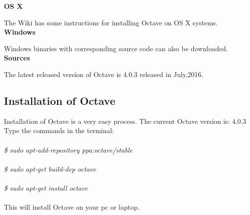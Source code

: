  \textbf{OS X}

 The Wiki has some instructions for installing Octave on OS X systems.\\
 
\textbf{Windows}
 
 Windows binaries with corresponding source code can also be downloaded.\\
 
 \textbf{Sources}
 
 The latest released version of Octave is 4.0.3 released in July,2016.
\subsection{Installation of Octave}
Installation of Octave is a very easy process.
The current Octave version is: 4.0.3
Type the commands in the terminal:\\\\
\emph{
\$ sudo apt-add-repository ppa:octave/stable\\\\
\$ sudo apt-get build-dep octave\\\\
\$ sudo apt-get install octave\\\\}
This will install Octave on your pc or laptop.

